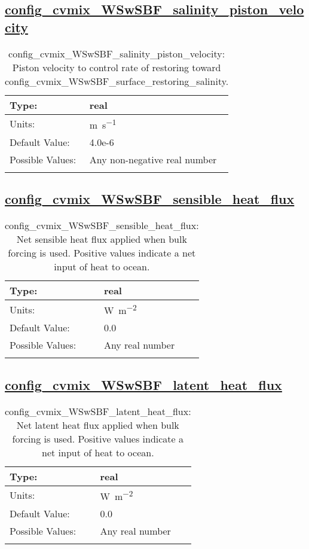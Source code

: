 \subsection[config\_cvmix\_WSwSBF\_salinity\_piston\_velocity]{\hyperref[sec:nm_tab_cvmix_WSwSBF]{config\_cvmix\_WSwSBF\_salinity\_piston\_velocity}}
\label{subsec:nm_sec_config_cvmix_WSwSBF_salinity_piston_velocity}
\begin{center}
\begin{longtable}{| p{2.0in} || p{4.0in} |}
    \hline
    Type: & real \\
    \hline
    Units: & \si{m.s^{-1}} \\
    \hline
    Default Value: & 4.0e-6 \\
    \hline
    Possible Values: & Any non-negative real number \\
    \hline
    \caption{config\_cvmix\_WSwSBF\_salinity\_piston\_velocity: Piston velocity to control rate of restoring toward config\_cvmix\_WSwSBF\_surface\_restoring\_salinity.}
\end{longtable}
\end{center}
\subsection[config\_cvmix\_WSwSBF\_sensible\_heat\_flux]{\hyperref[sec:nm_tab_cvmix_WSwSBF]{config\_cvmix\_WSwSBF\_sensible\_heat\_flux}}
\label{subsec:nm_sec_config_cvmix_WSwSBF_sensible_heat_flux}
\begin{center}
\begin{longtable}{| p{2.0in} || p{4.0in} |}
    \hline
    Type: & real \\
    \hline
    Units: & \si{W.m^{-2}} \\
    \hline
    Default Value: & 0.0 \\
    \hline
    Possible Values: & Any real number \\
    \hline
    \caption{config\_cvmix\_WSwSBF\_sensible\_heat\_flux: Net sensible heat flux applied when bulk forcing is used. Positive values indicate a net input of heat to ocean.}
\end{longtable}
\end{center}
\subsection[config\_cvmix\_WSwSBF\_latent\_heat\_flux]{\hyperref[sec:nm_tab_cvmix_WSwSBF]{config\_cvmix\_WSwSBF\_latent\_heat\_flux}}
\label{subsec:nm_sec_config_cvmix_WSwSBF_latent_heat_flux}
\begin{center}
\begin{longtable}{| p{2.0in} || p{4.0in} |}
    \hline
    Type: & real \\
    \hline
    Units: & \si{W.m^{-2}} \\
    \hline
    Default Value: & 0.0 \\
    \hline
    Possible Values: & Any real number \\
    \hline
    \caption{config\_cvmix\_WSwSBF\_latent\_heat\_flux: Net latent heat flux applied when bulk forcing is used. Positive values indicate a net input of heat to ocean.}
\end{longtable}
\end{center}

